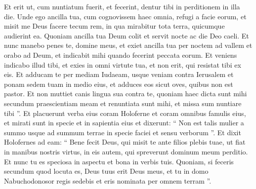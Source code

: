 \begin{biblechapter}
\begin{biblechapter}
\begin{biblechapter}
\begin{biblechapter}
\begin{biblechapter}
\begin{biblechapter}
\begin{biblechapter}
\begin{biblechapter}
\begin{biblechapter}
\begin{biblechapter}
\begin{biblechapter}
\verse Et erit ut, cum nuntiatum fuerit, et fecerint, dentur tibi in perditionem in illa die.
 \verse Unde ego ancilla tua, cum cognovissem haec omnia, refugi a facie eorum, et misit me Deus facere tecum rem, in qua mirabitur tota terra, quicumque audierint ea. 
\verse Quoniam ancilla tua Deum colit et servit nocte ac die Deo caeli. Et nunc manebo penes te, domine meus, et exiet ancilla tua per noctem ad vallem et orabo ad Deum, et indicabit mihi quando fecerint peccata eorum. 
\verse Et veniens indicabo illud tibi, et exies in omni virtute tua, et non erit, qui resistat tibi ex eis. 
\verse Et adducam te per mediam Iudaeam, usque veniam contra Ierusalem et ponam sedem tuam in medio eius, et adduces eos sicut oves, quibus non est pastor. Et non muttiet canis lingua sua contra te, quoniam haec dicta sunt mihi secundum praescientiam meam et renuntiata sunt mihi, et missa sum nuntiare tibi ”.
 \verse Et placuerunt verba eius coram Holoferne et coram omnibus famulis eius, et mirati sunt in specie et in sapientia eius et dixerunt: 
\verse “ Non est talis mulier a summo usque ad summum terrae in specie faciei et sensu verborum ”. 
 \verse Et dixit Holofernes ad eam: “ Bene fecit Deus, qui misit te ante filios plebis tuae, ut fiat in manibus nostris virtus, in eis autem, qui spreverunt dominum meum perditio. 
\verse Et nunc tu es speciosa in aspectu et bona in verbis tuis. Quoniam, si feceris secundum quod locuta es, Deus tuus erit Deus meus, et tu in domo Nabuchodonosor regis sedebis et eris nominata per omnem terram ”.
 

\end{biblechapter}
\end{biblechapter}
\end{biblechapter}
\end{biblechapter}
\end{biblechapter}
\end{biblechapter}
\end{biblechapter}
\end{biblechapter}
\end{biblechapter}
\end{biblechapter}
\end{biblechapter}

